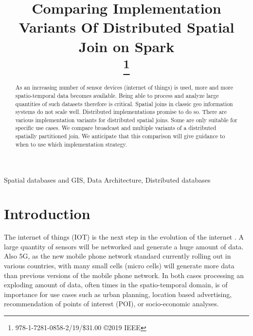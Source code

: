 \documentclass[conference]{IEEEtran}
\begin{document}
\title{Comparing Implementation Variants Of Distributed Spatial Join on Spark\\
\thanks{978-1-7281-0858-2/19/\$31.00 \copyright 2019 IEEE}
}

\author{
\and
{}

}

\maketitle

\begin{abstract}
As an increasing number of sensor devices (internet of things) is used, more and more spatio-temporal data becomes available.
Being able to process and analyze large quantities of such datasets therefore is critical.
Spatial joins in classic geo information systems do not scale well. Distributed implementations promise to do so.
There are various implementation variants for distributed spatial joins.
Some are only suitable for specific use cases.
We compare broadcast and multiple variants of a distributed spatially partitioned join.
We anticipate that this comparison will give guidance to when to use which implementation strategy.
\end{abstract}

\begin{IEEEkeywords}
Spatial databases and GIS, Data Architecture, Distributed databases
\end{IEEEkeywords}

\section{Introduction}
The internet of things (IOT) is the next step in the evolution of the internet \cite{Lin2017}.
A large quantity of sensors will be networked and generate a huge amount of data.
Also 5G, as the new mobile phone network standard currently rolling out in various countries, with many small cells (micro cells) will generate more data than previous versions of the mobile phone network.
In both cases processing an exploding amount of  data, often times in the spatio-temporal domain, is of importance for use cases such as urban planning, location based advertising, recommendation of points of interest (POI), or socio-economic analyses.
\end{document}
